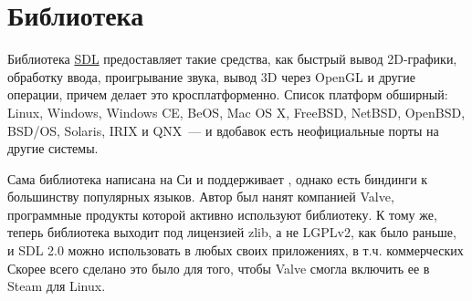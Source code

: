 \chapter{Библиотека  }

Библиотека \href{http://www.libsdl.org/}{SDL} предоставляет такие средства, как
быстрый вывод 2D-графики, обработку ввода, проигрывание звука, вывод 3D через
OpenGL и другие операции, причем делает это кросплатформенно.
Список платформ обширный: Linux, Windows, Windows CE, BeOS, Mac OS X, FreeBSD, NetBSD,
OpenBSD, BSD/OS, Solaris, IRIX и QNX\ --- и вдобавок есть неофициальные порты на
другие системы.

Сама библиотека написана на Си и поддерживает \cpp, однако есть биндинги к
большинству популярных языков. Автор  был нанят компанией Valve,
программные продукты которой активно используют библиотеку. К тому же, теперь
библиотека выходит под лицензией zlib, а не LGPLv2, как было раньше, и SDL 2.0
можно использовать в любых своих приложениях, в т.ч. коммерческих Скорее всего
сделано это было для того, чтобы Valve смогла включить ее в Steam для Linux.
